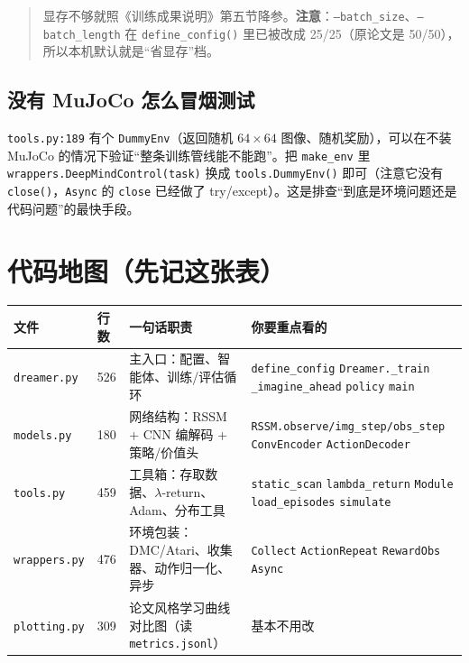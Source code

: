 \documentclass[11pt]{ctexart}
\begin{document}
\begin{quote}
显存不够就照《训练成果说明》第五节降参。\textbf{注意}：\texttt{--batch\_size}、\texttt{--batch\_length} 在 \texttt{define\_config()} 里已被改成 25/25（原论文是 50/50），所以本机默认就是``省显存''档。
\end{quote}

\subsection{没有 MuJoCo 怎么冒烟测试}
\texttt{tools.py:189} 有个 \texttt{DummyEnv}（返回随机 $64\times64$ 图像、随机奖励），可以在不装 MuJoCo 的情况下验证``整条训练管线能不能跑''。把 \texttt{make\_env} 里 \texttt{wrappers.DeepMindControl(task)} 换成 \texttt{tools.DummyEnv()} 即可（注意它没有 \texttt{close()}，\texttt{Async} 的 \texttt{close} 已经做了 try/except）。这是排查``到底是环境问题还是代码问题''的最快手段。

\section{代码地图（先记这张表）}

\begin{tabularx}{\textwidth}{l l L L}
\toprule
\textbf{文件} & \textbf{行数} & \textbf{一句话职责} & \textbf{你要重点看的} \\
\midrule
\texttt{dreamer.py} & 526 & 主入口：配置、智能体、训练/评估循环 & \texttt{define\_config} \texttt{Dreamer.\_train} \texttt{\_imagine\_ahead} \texttt{policy} \texttt{main} \\
\addlinespace
\texttt{models.py} & 180 & 网络结构：RSSM + CNN 编解码 + 策略/价值头 & \texttt{RSSM.observe/img\_step/obs\_step} \texttt{ConvEncoder} \texttt{ActionDecoder} \\
\addlinespace
\texttt{tools.py} & 459 & 工具箱：存取数据、$\lambda$-return、Adam、分布工具 & \texttt{static\_scan} \texttt{lambda\_return} \texttt{Module} \texttt{load\_episodes} \texttt{simulate} \\
\addlinespace
\texttt{wrappers.py} & 476 & 环境包装：DMC/Atari、收集器、动作归一化、异步 & \texttt{Collect} \texttt{ActionRepeat} \texttt{RewardObs} \texttt{Async} \\
\addlinespace
\texttt{plotting.py} & 309 & 论文风格学习曲线对比图（读 \texttt{metrics.jsonl}） & 基本不用改 \\
\bottomrule
\end{tabularx}
\end{document}

